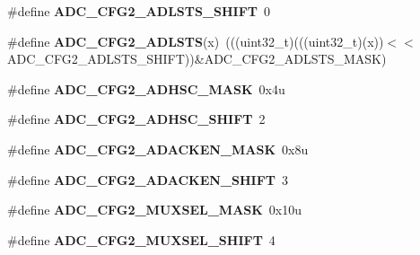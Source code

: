 \begin{DoxyCompactItemize}
\item 
\#define {\bfseries A\+D\+C\+\_\+\+C\+F\+G2\+\_\+\+A\+D\+L\+S\+T\+S\+\_\+\+S\+H\+I\+FT}~0\hypertarget{group__ADC__Register__Masks_ga8d39dceb9fa2550294f0623cc1fbc3f3}{}\label{group__ADC__Register__Masks_ga8d39dceb9fa2550294f0623cc1fbc3f3}

\item 
\#define {\bfseries A\+D\+C\+\_\+\+C\+F\+G2\+\_\+\+A\+D\+L\+S\+TS}(x)~(((uint32\+\_\+t)(((uint32\+\_\+t)(x))$<$$<$A\+D\+C\+\_\+\+C\+F\+G2\+\_\+\+A\+D\+L\+S\+T\+S\+\_\+\+S\+H\+I\+FT))\&A\+D\+C\+\_\+\+C\+F\+G2\+\_\+\+A\+D\+L\+S\+T\+S\+\_\+\+M\+A\+SK)\hypertarget{group__ADC__Register__Masks_gae23653c06f0dfe00b27a15ef15138c8e}{}\label{group__ADC__Register__Masks_gae23653c06f0dfe00b27a15ef15138c8e}

\item 
\#define {\bfseries A\+D\+C\+\_\+\+C\+F\+G2\+\_\+\+A\+D\+H\+S\+C\+\_\+\+M\+A\+SK}~0x4u\hypertarget{group__ADC__Register__Masks_ga73cb928c5cacb18e02a3f0d67dcf1e6f}{}\label{group__ADC__Register__Masks_ga73cb928c5cacb18e02a3f0d67dcf1e6f}

\item 
\#define {\bfseries A\+D\+C\+\_\+\+C\+F\+G2\+\_\+\+A\+D\+H\+S\+C\+\_\+\+S\+H\+I\+FT}~2\hypertarget{group__ADC__Register__Masks_ga447389268d77124eb2012fd98bfe07ce}{}\label{group__ADC__Register__Masks_ga447389268d77124eb2012fd98bfe07ce}

\item 
\#define {\bfseries A\+D\+C\+\_\+\+C\+F\+G2\+\_\+\+A\+D\+A\+C\+K\+E\+N\+\_\+\+M\+A\+SK}~0x8u\hypertarget{group__ADC__Register__Masks_ga1158034a83b78e238c3f8ca481ab9b27}{}\label{group__ADC__Register__Masks_ga1158034a83b78e238c3f8ca481ab9b27}

\item 
\#define {\bfseries A\+D\+C\+\_\+\+C\+F\+G2\+\_\+\+A\+D\+A\+C\+K\+E\+N\+\_\+\+S\+H\+I\+FT}~3\hypertarget{group__ADC__Register__Masks_gad009e6fe93b9f44fb0f79cd479d8bb1a}{}\label{group__ADC__Register__Masks_gad009e6fe93b9f44fb0f79cd479d8bb1a}

\item 
\#define {\bfseries A\+D\+C\+\_\+\+C\+F\+G2\+\_\+\+M\+U\+X\+S\+E\+L\+\_\+\+M\+A\+SK}~0x10u\hypertarget{group__ADC__Register__Masks_ga5c50199c9b27cb92554a647909c6338a}{}\label{group__ADC__Register__Masks_ga5c50199c9b27cb92554a647909c6338a}

\item 
\#define {\bfseries A\+D\+C\+\_\+\+C\+F\+G2\+\_\+\+M\+U\+X\+S\+E\+L\+\_\+\+S\+H\+I\+FT}~4\hypertarget{group__ADC__Register__Masks_ga3d74b5bda99558af8b4f0e986ef7ea9b}{}\label{group__ADC__Register__Masks_ga3d74b5bda99558af8b4f0e986ef7ea9b}


\end{DoxyCompactItemize}
